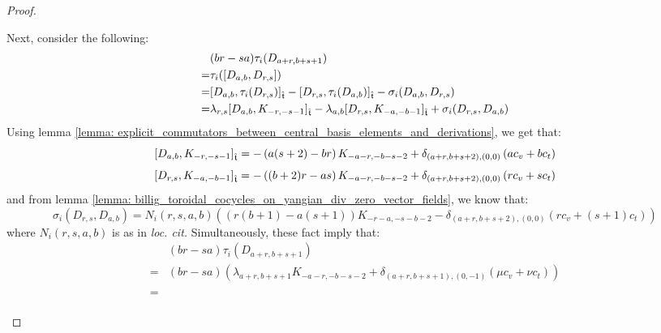 \begin{proof}
\begin{itemize}
                    Next, consider the following:
                        $$
                            \begin{aligned}
                                & (br - sa) \tau_i(D_{a + r, b + s + 1})
                                \\
                                = & \tau_i( [D_{a, b}, D_{r, s}] )
                                \\
                                = & [D_{a, b}, \tau_i(D_{r, s})]_{\hat{\mathfrak{t}}} - [D_{r, s}, \tau_i(D_{a, b})]_{\hat{\mathfrak{t}}} - \sigma_i(D_{a, b}, D_{r, s})
                                \\
                                = & \lambda_{r, s} [D_{a, b}, K_{-r, -s - 1}]_{\hat{\mathfrak{t}}} - \lambda_{a, b} [D_{r, s}, K_{-a, -b - 1}]_{\hat{\mathfrak{t}}} + \sigma_i(D_{r, s}, D_{a, b})
                            \end{aligned}
                        $$
                    Using lemma \ref{lemma: explicit_commutators_between_central_basis_elements_and_derivations}, we get that:
                        $$[D_{a, b}, K_{-r, -s - 1}]_{\hat{\mathfrak{t}}} = -\left( a(s + 2) - br \right) K_{-a - r, -b - s - 2} + \delta_{(a + r, b + s + 2), (0, 0)} \left( a c_v + b c_t \right)$$
                        $$[D_{r, s}, K_{-a, -b - 1}]_{\hat{\mathfrak{t}}} = -\left( (b + 2) r - as \right) K_{-a - r, -b - s - 2} + \delta_{(a + r, b + s + 2), (0, 0)} \left( r c_v + s c_t \right)$$
                    and from lemma \ref{lemma: billig_toroidal_cocycles_on_yangian_div_zero_vector_fields}, we know that:
                        $$\sigma_i(D_{r, s}, D_{a, b}) = N_i(r, s, a, b) \left( ( r(b + 1) - a(s + 1) )K_{-r - a, -s - b - 2} - \delta_{ (a + r, b + s + 2), (0, 0) } (r c_v + (s + 1) c_t) \right)$$
                    where $N_i(r, s, a, b)$ is as in \textit{loc. cit.} Simultaneously, these fact imply that:
                        \begin{equation} \label{equation: coboundary_equation_D_rs_D_ab}
                            \begin{aligned}
                                & (br - sa) \tau_i(D_{a + r, b + s + 1})
                                \\
                                = & (br - sa) \left( \lambda_{a + r, b + s + 1} K_{-a - r, -b - s - 2} + \delta_{(a + r, b + s + 1), (0, -1)}( \mu c_v + \nu c_t ) \right)
                                \\
                                = &
                                \begin{aligned}

\end{aligned}
\end{aligned}
\end{equation}
\end{itemize}
\end{proof}
